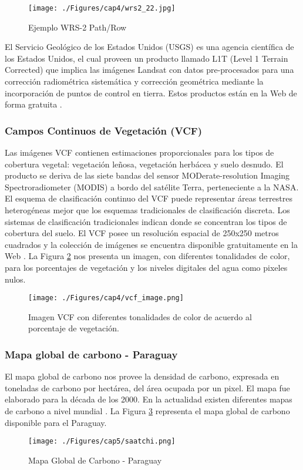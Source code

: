 \begin{figure}[H]
	\centering
	\texttt{[image: ./Figures/cap4/wrs2\_22.jpg]}
	\caption{Ejemplo WRS-2 Path/Row}
	\label{fig:wrs2Image}
\end{figure}

El Servicio Geol\'ogico de los Estados Unidos (USGS) es una agencia cient\'ifica de los Estados Unidos, el cual proveen un producto llamado L1T (Level 1 Terrain Corrected) que implica las im\'agenes Landsat con datos pre-procesados para una correcci\'on radiom\'etrica sistem\'atica y correcci\'on geom\'etrica mediante la incorporaci\'on de puntos de control en tierra. Estos productos est\'an en la Web de forma gratuita \cite{landsatNasa}.


\subsubsection{Campos Continuos de Vegetaci\'on (VCF)}\label{sec:vcf}
Las im\'agenes VCF contienen estimaciones proporcionales para los tipos de cobertura vegetal: vegetaci\'on le\~{n}osa, vegetaci\'on herb\'acea y suelo desnudo. El producto se deriva de las siete bandas del sensor MODerate-resolution Imaging Spectroradiometer (MODIS) a bordo del sat\'elite Terra, perteneciente a la NASA. El esquema de clasificaci\'on continuo del VCF puede representar \'areas terrestres heterog\'eneas mejor que los esquemas tradicionales de clasificaci\'on discreta. Los sistemas de clasificaci\'on tradicionales indican donde se concentran los tipos de cobertura del suelo. El VCF posee un resoluci\'on espacial de 250x250 metros cuadrados y la colecci\'on de im\'agenes se encuentra disponible gratuitamente en la Web \cite{gl2015Uni}.
La Figura \ref{fig:vcfImage} nos presenta un imagen, con diferentes tonalidades de color, para los porcentajes de vegetaci\'on y los niveles digitales del agua como pixeles nulos.
\begin{figure}[H]
	\centering
	\texttt{[image: ./Figures/cap4/vcf\_image.png]}
	\caption{Imagen VCF con diferentes tonalidades de color de acuerdo al porcentaje de vegetaci\'on.}
	\label{fig:vcfImage}
\end{figure}
\subsubsection{Mapa global de carbono - Paraguay}\label{sec:saatchiMapa}
El mapa global de carbono \cite{saatchi2011benchmark} nos provee la densidad de carbono, expresada en toneladas de carbono por hect\'area, del \'area ocupada por un pixel. El mapa fue elaborado para la d\'ecada de los 2000. En la actualidad existen diferentes mapas de carbono a nivel mundial \cite{saatchi2011benchmark}. La Figura \ref{fig:saatchi} representa el mapa global de carbono disponible para el Paraguay.
\begin{figure}[H]
	\centering
	\texttt{[image: ./Figures/cap5/saatchi.png]}
	\caption{Mapa Global de Carbono - Paraguay}
	\label{fig:saatchi}
\end{figure}



